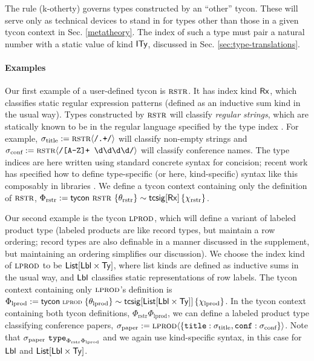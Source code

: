 \documentclass[10pt,preprint]{sigplanconf}
\begin{document}
The rule (k-otherty) governs types constructed by an ``other'' tycon. These will serve only as technical devices to stand in for types other than those in a given tycon context in Sec. \ref{metatheory}. The index of such a type must pair a natural number with a static value of kind ${\sf ITy}$, discussed in Sec. \ref{sec:type-translations}.




\paragraph{Examples}
Our first example of a user-defined tycon is $\textsc{rstr}$. It has index kind ${\sf Rx}$, which classifies static regular expression patterns (defined as an inductive sum kind in the usual way). Types constructed by $\textsc{rstr}$ will classify \emph{regular strings}, which are statically known to be in the regular language specified by the type index \cite{sanitation-psp14}. For example, $\sigma_\text{title} := {\textsc{rstr}}\langle\texttt{/.+/}\rangle$ will classify non-empty strings and $\sigma_\text{conf} := {\textsc{rstr}}\langle\texttt{/[A-Z]+ \textbackslash d\textbackslash d\textbackslash d\textbackslash d/}\rangle$ will classify conference names.  The type indices are  here written using standard concrete syntax for concision; recent work has specified how to define type-specific (or here, kind-specific) syntax like this composably in libraries \cite{TSLs}. We define a tycon context containing only the definition of $\textsc{rstr}$, $\Phi_\text{rstr} := {\sf tycon}~\textsc{rstr} ~\{\theta_\text{rstr}\} \sim {\sf tcsig}[{\sf Rx}]\,\{\chi_\text{rstr}\}$.

Our second example is the tycon $\textsc{lprod}$, which will define a variant of labeled product type (labeled products are like record types, but maintain a row  ordering; record types are also definable in a manner discussed in the supplement, but maintaining an ordering simplifies our discussion). We choose the index kind of $\textsc{lprod}$ to be ${\sf List}[{\sf Lbl} \times {\sf Ty}]$, where list kinds are defined as inductive sums in the usual way, and ${\sf Lbl}$ classifies static representations of row labels. The tycon context containing only $\textsc{lprod}$'s definition is $\small\Phi_\text{lprod} := \tcdef{\tcvar{lprod}}{\tcsig{\klist{\klbl \times \kty}}{\chi_\text{lprod}}}{\theta_\text{lprod}}$. In the tycon context containing both tycon definitions, $\Phi_\text{rstr}\Phi_\text{lprod}$, we can define a labeled product type classifying conference papers, $\sigma_\text{paper} := {\textsc{lprod}}\langle\{\texttt{title} : \sigma_\text{title}, \texttt{conf} : \sigma_\text{conf}\}\rangle$. Note that $\sigma_\text{paper}~\texttt{type}_{\Phi_\text{rstr}\Phi_\text{lprod}}$ and we again use kind-specific syntax, in this case for ${\sf Lbl}$ and ${\sf List}[{\sf Lbl} \times {\sf Ty}]$.
\end{document}
